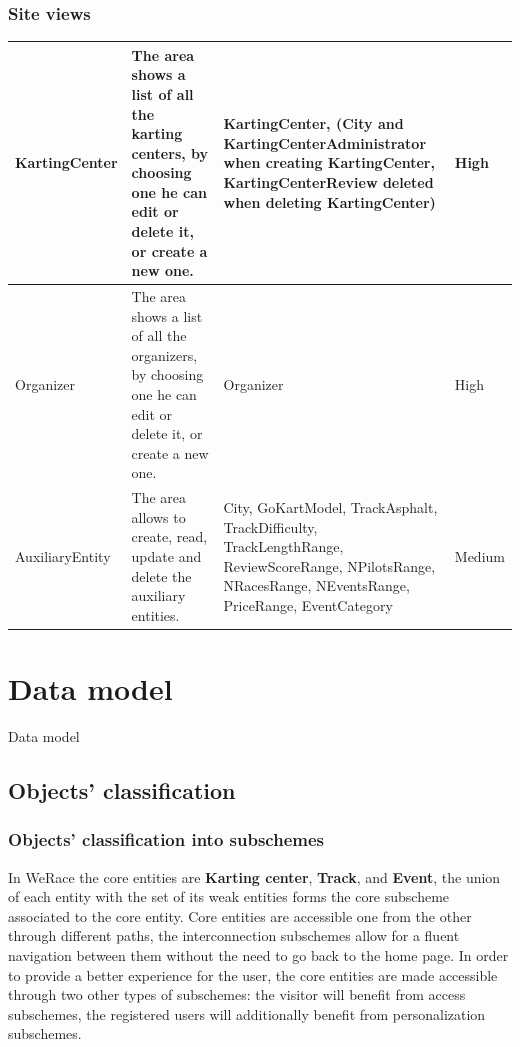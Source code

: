 \documentclass{beamer}
\newcommand{\kc}{WeRace}
\begin{document}
\begin{frame}
    \frametitle{Site views}
    \begin{table}
        \centering
        \tiny
        \setlength{\tabcolsep}{1pt}
        \begin{tabular}{|m{2cm}|m{4cm}|m{3cm}|m{1cm}|}
        \hline
        KartingCenter & The area shows a list of all the karting centers,
        by choosing one he can edit or delete it, or create a new one.
         & KartingCenter, (City and KartingCenterAdministrator when creating KartingCenter, KartingCenterReview 
        deleted when deleting KartingCenter) & High \\
        \hline
        Organizer & The area shows a list of all the organizers,
        by choosing one he can edit or delete it, or create a new one.
         & Organizer & High \\
        \hline
        AuxiliaryEntity & The area allows to create, read, update and delete the auxiliary entities.
         & City, GoKartModel, 
        TrackAsphalt, TrackDifficulty, TrackLengthRange, ReviewScoreRange, NPilotsRange, NRacesRange, NEventsRange, PriceRange, EventCategory & Medium \\
        \hline
        \end{tabular}
    \end{table}
\end{frame}

\section{Data model}

\begin{frame}{Data model}

\end{frame}

\subsection{Objects' classification}

\begin{frame}
    \frametitle{Objects' classification into subschemes}
    In \kc{} the core entities are \textbf{Karting center}, \textbf{Track}, and \textbf{Event},
    the union of each entity with the set of its weak entities forms the core subscheme associated to the core entity. 
    Core entities are accessible one from the other through different paths, the interconnection subschemes
    allow for a fluent navigation between them without the need to go back to the home page.  
    In order to provide a better experience for the user, the core entities are made accessible through
    two other types of subschemes: the visitor will benefit from access subschemes, the registered users will additionally
    benefit from personalization subschemes.
\end{frame}
\end{document}
